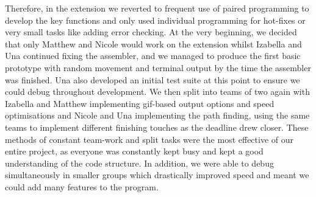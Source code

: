 \documentclass[11pt]{article}
\begin{document}
\par Therefore, in the extension we reverted to frequent use of paired programming to develop the key functions and only used individual programming for hot-fixes or very small tasks like adding error checking.
At the very beginning, we decided that only Matthew and Nicole would work on the extension whilst Izabella and Una continued fixing the assembler, and we managed to produce the first basic prototype with random movement and terminal output by the time the assembler was finished.
Una also developed an initial test suite at this point to ensure we could debug throughout development. 
We then split into teams of two again with Izabella and Matthew implementing gif-based output options and speed optimisations and Nicole and Una implementing the path finding, using the same teams to implement different finishing touches as the deadline drew closer.
These methods of constant team-work and split tasks were the most effective of our entire project, as everyone was constantly kept busy and kept a good understanding of the code structure. 
In addition, we were able to debug simultaneously in smaller groups which drastically improved speed and meant we could add many features to the program.
\end{document}
